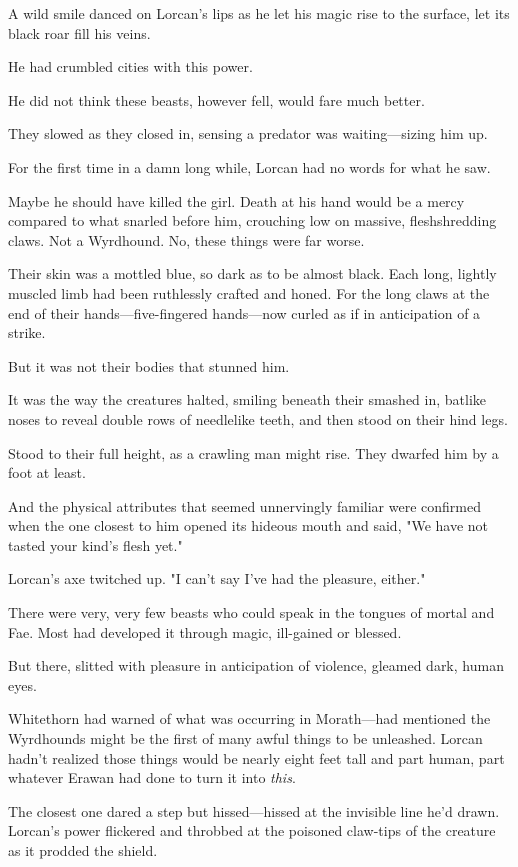A wild smile danced on Lorcan's lips as he let his magic rise to the surface, let its black roar fill his veins.

He had crumbled cities with this power.

He did not think these beasts, however fell, would fare much better.

They slowed as they closed in, sensing a predator was waiting---sizing him up.

For the first time in a damn long while, Lorcan had no words for what he saw.

Maybe he should have killed the girl. Death at his hand would be a mercy compared to what snarled before him, crouching low on massive, fleshshredding claws. Not a Wyrdhound. No, these things were far worse.

Their skin was a mottled blue, so dark as to be almost black. Each long, lightly muscled limb had been ruthlessly crafted and honed. For the long claws at the end of their hands---five-fingered hands---now curled as if in anticipation of a strike.

But it was not their bodies that stunned him.

It was the way the creatures halted, smiling beneath their smashed in, batlike noses to reveal double rows of needlelike teeth, and then stood on their hind legs.

Stood to their full height, as a crawling man might rise. They dwarfed him by a foot at least.

And the physical attributes that seemed unnervingly familiar were confirmed when the one closest to him opened its hideous mouth and said, "We have not tasted your kind's flesh yet."

Lorcan's axe twitched up. "I can't say I've had the pleasure, either."

There were very, very few beasts who could speak in the tongues of mortal and Fae. Most had developed it through magic, ill-gained or blessed.

But there, slitted with pleasure in anticipation of violence, gleamed dark, human eyes.

Whitethorn had warned of what was occurring in Morath---had mentioned the Wyrdhounds might be the first of many awful things to be unleashed. Lorcan hadn't realized those things would be nearly eight feet tall and part human, part whatever Erawan had done to turn it into \emph{this}.

The closest one dared a step but hissed---hissed at the invisible line he'd drawn. Lorcan's power flickered and throbbed at the poisoned claw-tips of the creature as it prodded the shield.

